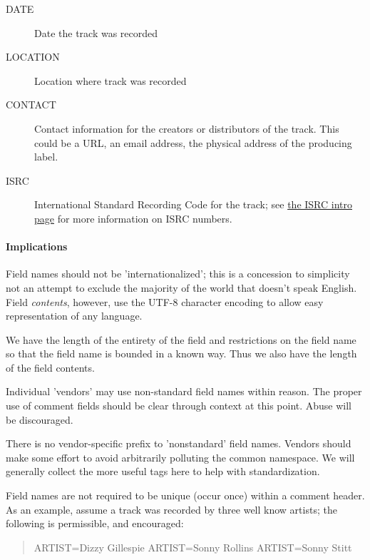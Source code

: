 \begin{description}
\item[DATE]
	Date the track was recorded

\item[LOCATION]
	Location where track was recorded

\item[CONTACT]
	Contact information for the creators or distributors of the track. This could be a URL, an email address, the physical address of the producing label.

\item[ISRC]
	International Standard Recording Code for the
track; see \href{http://www.ifpi.org/isrc/}{the ISRC
intro page} for more information on ISRC numbers.

\end{description}



\paragraph{Implications}

Field names should not be 'internationalized'; this is a
concession to simplicity not an attempt to exclude the majority of
the world that doesn't speak English. Field \emph{contents},
however, use the UTF-8 character encoding to allow easy representation
of any language.

We have the length of the entirety of the field and restrictions on
the field name so that the field name is bounded in a known way. Thus
we also have the length of the field contents.

Individual 'vendors' may use non-standard field names within
reason. The proper use of comment fields should be clear through
context at this point.  Abuse will be discouraged.

There is no vendor-specific prefix to 'nonstandard' field names.
Vendors should make some effort to avoid arbitrarily polluting the
common namespace. We will generally collect the more useful tags
here to help with standardization.

Field names are not required to be unique (occur once) within a
comment header.  As an example, assume a track was recorded by three
well know artists; the following is permissible, and encouraged:

\begin{quote}
\begin{programlisting}
ARTIST=Dizzy Gillespie
ARTIST=Sonny Rollins
ARTIST=Sonny Stitt
\end{programlisting}
\end{quote}







